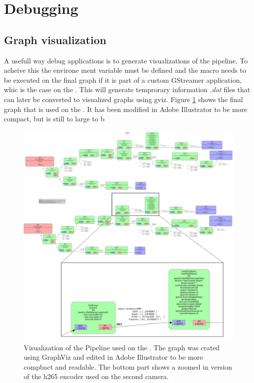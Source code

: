 \section{Debugging}

\subsection{Graph visualization}
A usefull way debug \gs applications is to generate visualizations of the pipeline.
To acheive this the environe ment variable  must be defined and the  macro needs to be executed on the final graph if it is part of a custom GStreamer application, whic is the case on the \sr.
\cite{johnstonGeneratingGStreamerPipeline2018}
This will generate temprorary information \textit{.dot} files that can later be converted to visualized graphs using \gls{gviz}.
Figure \ref{fig:gs_pipeline_visualization} shows the final graph that is used on the \sr.
It has been modified in Adobe Illustrator to be more compact, but is still to large to b


\begin{figure}[H]
    \centering
    \includegraphics[width=\textwidth]{figures/gstreamer/pipeline.pdf}
    \caption{Visualization of the \gs Pipeline used on the \sr.
        The graph was crated using GraphViz and edited in Adobe Illustrator to be more compbact and readable.
        The bottom part shows a zoomed in version of the \gls{h265} encoder used on the second camera.}
    \label{fig:gs_pipeline_visualization}
\end{figure}

